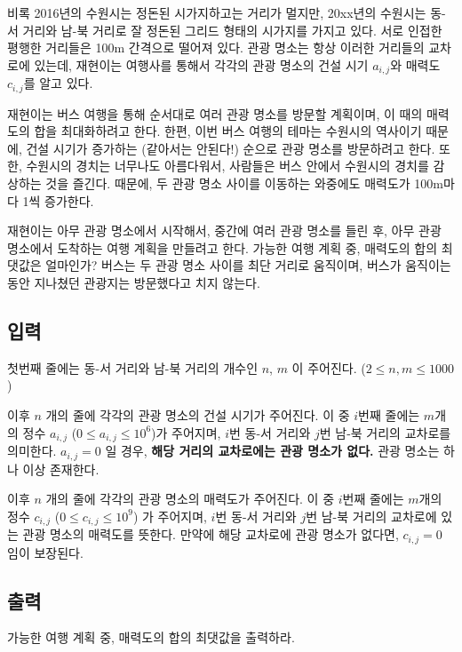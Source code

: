 \documentclass{article}
\begin{document}
비록 2016년의 수원시는 정돈된 시가지하고는 거리가 멀지만, 20xx년의 수원시는 동-서 거리와 남-북 거리로 잘 정돈된 그리드 형태의 시가지를 가지고 있다. 서로 인접한 평행한 거리들은 100m 간격으로 떨어져 있다. 관광 명소는 항상 이러한 거리들의 교차로에 있는데, 재현이는 여행사를 통해서 각각의 관광 명소의 건설 시기 $a_{i, j}$와 매력도 $c_{i, j}$를 알고 있다. \newline

재현이는 버스 여행을 통해 순서대로 여러 관광 명소를 방문할 계획이며, 이 때의 매력도의 합을 최대화하려고 한다. 한편, 이번 버스 여행의 테마는 수원시의 역사이기 때문에, 건설 시기가  증가하는 (같아서는 안된다!) 순으로 관광 명소를 방문하려고 한다. 또한, 수원시의 경치는 너무나도 아름다워서, 사람들은 버스 안에서 수원시의 경치를 감상하는 것을 즐긴다. 때문에, 두 관광 명소 사이를 이동하는 와중에도 매력도가 100m마다 1씩 증가한다. \newline

재현이는 아무 관광 명소에서 시작해서, 중간에 여러 관광 명소를 들린 후, 아무 관광 명소에서 도착하는 여행 계획을 만들려고 한다. 가능한 여행 계획 중, 매력도의 합의 최댓값은 얼마인가? 버스는 두 관광 명소 사이를 최단 거리로 움직이며, 버스가 움직이는 동안 지나쳤던 관광지는 방문했다고 치지 않는다. 


\subsection{입력}
첫번째 줄에는 동-서 거리와 남-북 거리의 개수인 $n$, $m$ 이 주어진다. ($2 \leq n, m \leq 1000$) \newline

이후 $n$ 개의 줄에 각각의 관광 명소의 건설 시기가 주어진다. 이 중 $i$번째 줄에는 $m$개의 정수 $a_{i, j}$ ($0 \leq a_{i, j} \leq 10^6$)가 주어지며, $i$번 동-서 거리와 $j$번 남-북 거리의 교차로를 의미한다. $a_{i, j} = 0$ 일 경우, \textbf{해당 거리의 교차로에는 관광 명소가 없다.} 관광 명소는 하나 이상 존재한다.\newline

이후 $n$ 개의 줄에 각각의 관광 명소의 매력도가 주어진다. 이 중 $i$번째 줄에는 $m$개의 정수 $c_{i, j}$ ($0 \leq c_{i, j} \leq 10^9$) 가 주어지며, $i$번 동-서 거리와 $j$번 남-북 거리의 교차로에 있는 관광 명소의 매력도를 뜻한다. 만약에 해당 교차로에 관광 명소가 없다면, $c_{i, j} = 0$ 임이 보장된다. 

\subsection{출력}
가능한 여행 계획 중, 매력도의 합의 최댓값을 출력하라.
\end{document}
